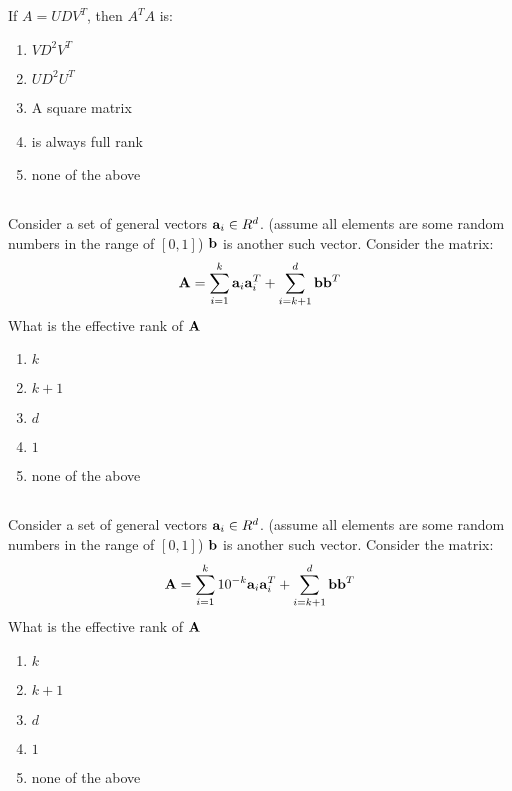 \begin{frame}
\section{}
   If $A=UDV^T$, then $A^TA$ is:
    \begin{enumerate}[label=(\Alph*)]
      \item $VD^2V^T$
      \item $UD^2U^T$
      \item A square matrix
      \item is always full rank
      \item none of the above
    \end{enumerate}
\end{frame}

\begin{frame}
\section{}
  Consider a set of general vectors ${\bf a}_i\in R^d$. (assume all elements are some random numbers in the range of $[0,1]$)
  ${\bf b}$ is another such vector. Consider the matrix:
     \[ {\bf A} = \sum_{i=1}^k {\bf a}_i {\bf a}_i^T + \sum_{i=k+1}^d {\bf b}{\bf b}^T\]
   What is the effective rank of ${\bf A}$
   \begin{enumerate}[label=(\Alph*)]
      \item $k$
      \item $k+1$
      \item $d$
      \item $1$
      \item none of the above
     \end{enumerate}
\end{frame}

\begin{frame}
\section{}
  Consider a set of general vectors ${\bf a}_i\in R^d$. (assume all elements are some random numbers in the range of $[0,1]$)
  ${\bf b}$ is another such vector. Consider the matrix:
  \[ {\bf A} = \sum_{i=1}^k 10^{-k} {\bf a}_i {\bf a}_i^T + \sum_{i=k+1}^d {\bf b}{\bf b}^T\]
  What is the effective rank of ${\bf A}$
    \begin{enumerate}[label=(\Alph*)]
      \item $k$
      \item $k+1$
      \item $d$
      \item $1$
      \item none of the above
    \end{enumerate}
\end{frame}

